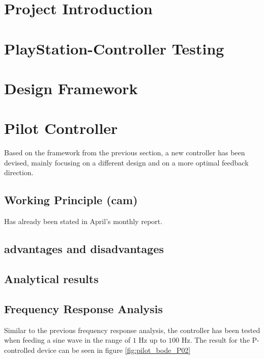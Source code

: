 \section{Project Introduction}



\section{PlayStation-Controller Testing}


\section{Design Framework}


\section{Pilot Controller}
Based on the framework from the previous section, a new controller has been devised, mainly focusing on a different design and on a more optimal feedback direction.

\subsection{Working Principle (cam)}%
Has already been stated in April's monthly report.


\subsection{advantages and disadvantages}%
\subsection{Analytical results}
\subsection{Frequency Response Analysis}
Similar to the previous frequency response analysis, the controller has been tested when feeding a sine wave in the range of $1$ Hz up to $100$ Hz. The result for the P-controlled device can be seen in figure \ref{fig:pilot_bode_P02}


